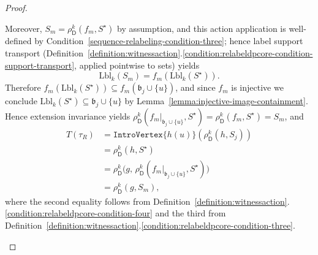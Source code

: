 \documentclass[11pt,a4paper]{article}
\newcommand{\treewidthvalue}{k}
\newcommand{\abag}{\mathfrak{b}}
\newcommand{\introvertextype}[1]{\mathtt{IntroVertex}\{#1\}}
\newcommand{\abstractdecomposition}{\tau}
\newcommand{\vertexone}{u}
\newcommand{\dpcore}{\mathsf{D}}
\newcommand{\witnessset}{S}
\newcommand{\dprefutation}{R}
\newcommand{\subtermToBag}{T}
\newcommand{\relabelingfunction}{f}
\newcommand{\action}{\rho}
\begin{document}
\begin{proof}
\begin{enumerate}
	Moreover, $\witnessset_m=\action_{\dpcore}^{\treewidthvalue}(\relabelingfunction_m,S^\star)$ by assumption, and this action application is well-defined by Condition~\ref{sequence-relabeling-condition-three}; hence label support transport (Definition~\ref{definition:witnessaction}.\ref{condition:relabeldpcore-condition-support-transport}, applied pointwise to sets) yields
	\[
	\mathrm{Lbl}_{\treewidthvalue}(\witnessset_m)=\relabelingfunction_m(\mathrm{Lbl}_{\treewidthvalue}(S^\star)).
	\]
	Therefore $\relabelingfunction_m(\mathrm{Lbl}_{\treewidthvalue}(S^\star))\subseteq \relabelingfunction_m(\abag_j\cup\{\vertexone\})$, and since $\relabelingfunction_m$ is injective we conclude $\mathrm{Lbl}_{\treewidthvalue}(S^\star)\subseteq \abag_j\cup\{\vertexone\}$ by Lemma~\ref{lemma:injective-image-containment}.
	Hence extension invariance yields $\action_{\dpcore}^{\treewidthvalue}(\relabelingfunction_m|_{\abag_j\cup\{\vertexone\}},S^\star)=\action_{\dpcore}^{\treewidthvalue}(\relabelingfunction_m,S^\star)=\witnessset_m$, and
		\[
		\begin{aligned}
		\subtermToBag(\abstractdecomposition_{\dprefutation})
		&= \introvertextype{h(\vertexone)}(\action_{\dpcore}^{\treewidthvalue}(h,\witnessset_j))\\
		&= \action_{\dpcore}^{\treewidthvalue}(h,S^\star)\\
		&= \action_{\dpcore}^{\treewidthvalue}\bigl(g,\,\action_{\dpcore}^{\treewidthvalue}(\relabelingfunction_m|_{\abag_j\cup\{\vertexone\}},S^\star)\bigr)\\
		&= \action_{\dpcore}^{\treewidthvalue}(g,\witnessset_m),
		\end{aligned}
		\]
	where the second equality follows from Definition~\ref{definition:witnessaction}.\ref{condition:relabeldpcore-condition-four} and the third from Definition~\ref{definition:witnessaction}.\ref{condition:relabeldpcore-condition-three}.


\end{enumerate}
\end{proof}
\end{document}

